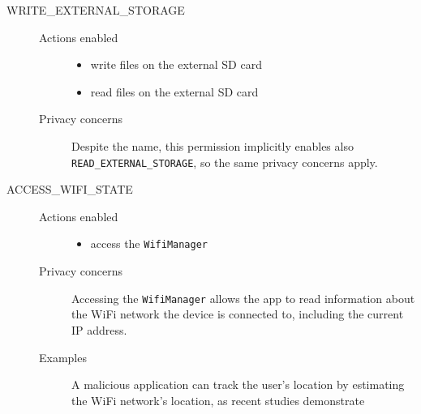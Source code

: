 \begin{description}
    \item[WRITE\_EXTERNAL\_STORAGE] \hfill
        \begin{description}
             \item[Actions enabled] \hfill
                \begin{itemize}
                    \item write files on the external SD card
                    \item read files on the external SD card
                 \end{itemize} 
             \item[Privacy concerns]
                Despite the name, this permission implicitly enables also \\ \texttt{READ\_EXTERNAL\_STORAGE}, so the same privacy concerns apply.
         \end{description} 

    \item[ACCESS\_WIFI\_STATE] \hfill
        \begin{description}
             \item[Actions enabled] \hfill
                \begin{itemize}
                    \item access the \texttt{WifiManager}
                 \end{itemize} 
             \item[Privacy concerns]
                Accessing the \texttt{WifiManager} allows the app to read information about the WiFi network the device is connected to, including the current IP address.
             \item[Examples]
                A malicious application can track the user's location by estimating the WiFi network's location, as recent studies demonstrate \cite{Yang:2008:ELU:1339822.1339967}
         \end{description} 


\end{description}
